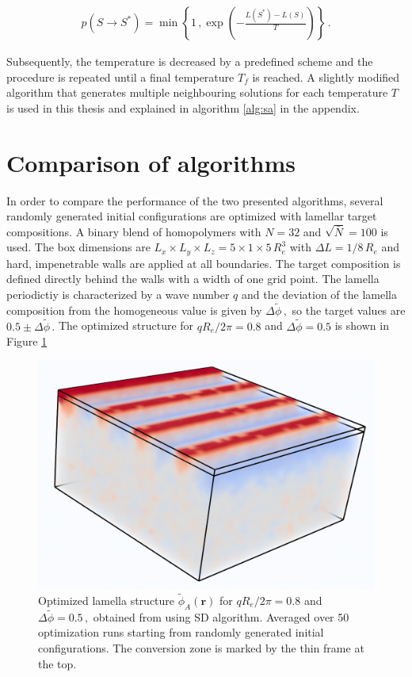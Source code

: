 \documentclass[bachelor,       %
               twoside,        %
               BCOR10mm,       %
               ngerman, english %
               ]{GAUBM}
\begin{document}
\begin{align}
    p(S\rightarrow S^*)=\min\left\{1\,,\exp\left(-\frac{L(S^*)-L(S)}{T}\right)\right\}\,.
\end{align}

Subsequently, the temperature is decreased by a predefined scheme and the procedure is repeated until a final temperature $T_f$ is reached. A slightly modified algorithm that generates multiple neighbouring solutions for each temperature $T$ is used in this thesis and explained in algorithm \ref{alg:sa} in the appendix.

\section{Comparison of algorithms}

In order to compare the performance of the two presented algorithms, several randomly generated initial configurations are optimized with lamellar target compositions. A binary blend of homopolymers with $N=32$ and $\sqrt{\bar N}=100$ is used. The box dimensions are $L_x\times L_y\times L_z=5\times1\times5\,R_e^3$ with $\Delta L=1/8\,R_e$ and hard, impenetrable  walls are applied at all boundaries. The target composition is defined directly behind the walls with a width of one grid point. The lamella periodictiy is characterized by a wave number $q$ and the deviation of the lamella composition from the homogeneous value is given by $\Delta\tilde\phi\,,$ so the target values are $0.5\pm\Delta\tilde\phi\,.$ The optimized structure for $qR_e/2\pi=0.8$ and $\Delta\tilde\phi=0.5$ is shown in Figure \ref{fig:conversion_box}


\begin{figure}[h]
    \centering
    \includegraphics[width=0.5
    \linewidth]{figures/conversion_box_large}
    \caption{Optimized lamella structure $\tilde\phi_A(\mathbf r)$ for $qR_e/2\pi=0.8$ and $\Delta\tilde\phi=0.5\,,$ obtained from using \ac{SD} algorithm. Averaged over 50 optimization runs starting from randomly generated initial configurations. The conversion zone is marked by the thin frame at the top.}
    \label{fig:conversion_box}
\end{figure}
\end{document}
